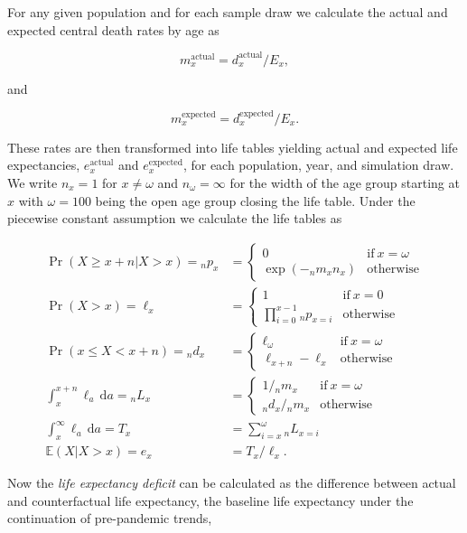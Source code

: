 \documentclass[12pt]{article}
\begin{document}
For any given population and for each sample draw we calculate the actual and expected central death rates by age as

$$
  m_{x}^\mathrm{actual} = d_{x}^\mathrm{actual} / E_{x},
$$

and

$$
  m_{x}^\mathrm{expected} = d_{x}^\mathrm{expected} / E_{x}.
$$

These rates are then transformed into life tables yielding actual and expected life expectancies, $e_{x}^\mathrm{actual}$ and $e_{x}^\mathrm{expected}$, for each population, year, and simulation draw. We write $n_x = 1$ for $x \neq \omega$ and $n_\omega = \infty$ for the width of the age group starting at $x$ with $\omega = 100$ being the open age group closing the life table. Under the piecewise constant assumption we calculate the life tables as

\begin{align*}
  \Pr(X \geq x+n|X>x) = {}_np_{x} &= \begin{cases}
    0 & \mathrm{if}~x = \omega \\
    \exp(-{}_nm_{x}n_x) & \mathrm{otherwise}
  \end{cases} \\
  \Pr(X>x) = \ell_{x} &= \begin{cases}
    1 & \mathrm{if}~x = 0\\
    \prod_{i=0}^{x-1} {}_np_{x=i} & \mathrm{otherwise}
  \end{cases} \\
  \Pr(x\leq X < x+n) = {}_nd_{x} &= \begin{cases}
    \ell_\omega & \mathrm{if}~x = \omega \\
    \ell_{x+n}-\ell_{x} & \mathrm{otherwise}
  \end{cases} \\
  \int_x^{x+n}\ell_a\,\mathrm{d}a = {}_nL_{x} &= \begin{cases}
    1/{}_nm_x & \mathrm{if}~x = \omega \\
    {}_nd_{x}/{}_nm_{x} & \mathrm{otherwise}
  \end{cases} \\
  \int_x^{\infty}\ell_a\,\mathrm{d}a = T_{x} &= \sum_{i=x}^\omega {}_nL_{x=i} \\
  \mathbb{E}(X|X>x) = e_x &= T_x/\ell_x.
\end{align*}

Now the \emph{life expectancy deficit} can be calculated as the difference between actual and counterfactual life expectancy, the baseline life expectancy under the continuation of pre-pandemic trends,
\end{document}
